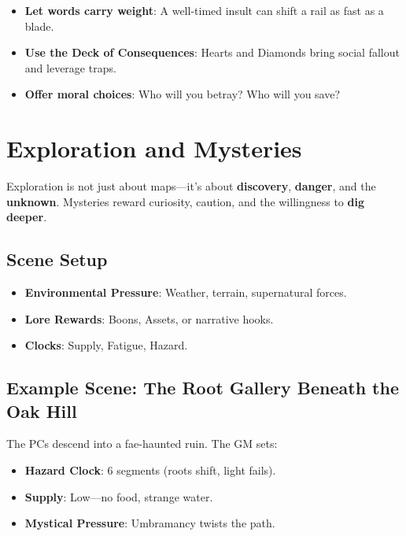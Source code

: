 \begin{itemize}
    \item \textbf{Let words carry weight}: A well-timed insult can shift a rail as fast as a blade.
    \item \textbf{Use the Deck of Consequences}: Hearts and Diamonds bring social fallout and leverage traps.
    \item \textbf{Offer moral choices}: Who will you betray? Who will you save?
\end{itemize}

\section*{Exploration and Mysteries}

Exploration is not just about maps---it's about \textbf{discovery}, \textbf{danger}, and the \textbf{unknown}. Mysteries reward curiosity, caution, and the willingness to \textbf{dig deeper}.

\subsection*{Scene Setup}

\begin{itemize}
    \item \textbf{Environmental Pressure}: Weather, terrain, supernatural forces.
    \item \textbf{Lore Rewards}: Boons, Assets, or narrative hooks.
    \item \textbf{Clocks}: Supply, Fatigue, Hazard.
\end{itemize}

\subsection*{Example Scene: The Root Gallery Beneath the Oak Hill}

The PCs descend into a fae-haunted ruin. The GM sets:

\begin{itemize}
    \item \textbf{Hazard Clock}: 6 segments (roots shift, light fails).
    \item \textbf{Supply}: Low---no food, strange water.
    \item \textbf{Mystical Pressure}: Umbramancy twists the path.
\end{itemize}

